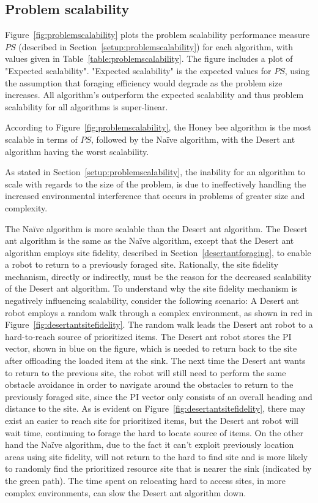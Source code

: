 
\subsection{Problem scalability}
\label{results:problemscalability}

Figure~\ref{fig:problemscalability} plots the problem scalability performance measure $PS$ (described in Section~\ref{setup:problemscalability}) for each algorithm, with values given in Table~\ref{table:problemscalability}. The figure includes a plot of "Expected scalability". "Expected scalability" is the expected values for $PS$, using the assumption that foraging efficiency would degrade as the problem size increases. All algorithm's outperform the expected scalability and thus problem scalability for all algorithms is super-linear.

According to Figure~\ref{fig:problemscalability}, the Honey bee algorithm is the most scalable in terms of $PS$, followed by the Na\"ive algorithm, with the Desert ant algorithm having the worst scalability. %

As stated in Section~\ref{setup:problemscalability}, the inability for an algorithm to scale with regards to the size of the problem, is due to ineffectively handling the increased environmental interference that occurs in problems of greater size and complexity.

The Na\"ive algorithm is more scalable than the Desert ant algorithm. The Desert ant algorithm is the same as the Na\"ive algorithm, except that the Desert ant algorithm employs site fidelity, described in Section~\ref{desertantforaging}, to enable a robot to return to a previously foraged site. Rationally, the site fidelity mechanism, directly or indirectly, must be the reason for the decreased scalability of the Desert ant algorithm. To understand why the site fidelity mechanism is negatively influencing scalability, consider the following scenario: A Desert ant robot employs a random walk through a complex environment, as shown in red in Figure~\ref{fig:desertantsitefidelity}. The random walk leads the Desert ant robot to a hard-to-reach source of prioritized items. The Desert ant robot stores the PI vector, shown in blue on the figure, which is needed to return back to the site after offloading the loaded item at the sink. The next time the Desert ant wants to return to the previous site, the robot will still need to perform the same obstacle avoidance in order to navigate around the obstacles to return to the previously foraged site, since the PI vector only consists of an overall heading and distance to the site. As is evident on Figure~\ref{fig:desertantsitefidelity}, there may exist an easier to reach site for prioritized items, but the Desert ant robot will wait time, continuing to forage the hard to locate source of items. On the other hand the Na\"ive algorithm, due to the fact it can't exploit previously location areas using site fidelity, will not return to the hard to find site and is more likely to randomly find the prioritized resource site that is nearer the sink (indicated by the green path). The time spent on relocating hard to access sites, in more complex environments, can slow the Desert ant algorithm down.

